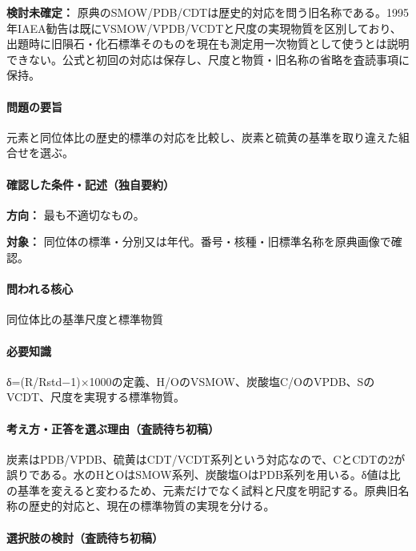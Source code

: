 \par\textbf{検討未確定：} 原典のSMOW/PDB/CDTは歴史的対応を問う旧名称である。1995年IAEA勧告は既にVSMOW/VPDB/VCDTと尺度の実現物質を区別しており、出題時に旧隕石・化石標準そのものを現在も測定用一次物質として使うとは説明できない。公式と初回の対応は保存し、尺度と物質・旧名称の省略を査読事項に保持。

\paragraph{問題の要旨} 元素と同位体比の歴史的標準の対応を比較し、炭素と硫黄の基準を取り違えた組合せを選ぶ。

\paragraph{確認した条件・記述（独自要約）}\mbox{}\par

\noindent\textbf{方向：} 最も不適切なもの。\par

\noindent\textbf{対象：} 同位体の標準・分別又は年代。番号・核種・旧標準名称を原典画像で確認。\par

\paragraph{問われる核心} 同位体比の基準尺度と標準物質

\paragraph{必要知識} δ=(R/Rstd−1)×1000の定義、H/OのVSMOW、炭酸塩C/OのVPDB、SのVCDT、尺度を実現する標準物質。

\paragraph{考え方・正答を選ぶ理由（査読待ち初稿）} 炭素はPDB/VPDB、硫黄はCDT/VCDT系列という対応なので、CとCDTの2が誤りである。水のHとOはSMOW系列、炭酸塩OはPDB系列を用いる。δ値は比の基準を変えると変わるため、元素だけでなく試料と尺度を明記する。原典旧名称の歴史的対応と、現在の標準物質の実現を分ける。

\paragraph{選択肢の検討（査読待ち初稿）}\mbox{}\par

